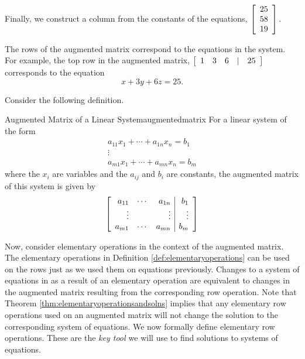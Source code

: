 Finally, we construct a column from the constants of the equations,
$\left[
\begin{array}{r}
25\\
58\\
19
\end{array}
\right] .$ 

The rows of the augmented matrix correspond to the equations in the system. For example, the top
row in the augmented matrix, 
$\left[
\begin{array}{rrrrr}
1 & 3 & 6 & | & 25
\end{array}
\right]$
 corresponds to the equation
\begin{equation*}
x+3y+6z=25.
\end{equation*}

Consider the following definition. 

\begin{definition}{Augmented Matrix of a Linear System}{augmentedmatrix}
For a linear system of the form
\begin{equation*}
\begin{array}{c}
a_{11}x_{1}+\cdots +a_{1n}x_{n}=b_{1} \\
\vdots \\
a_{m1}x_{1}+\cdots +a_{mn}x_{n}=b_{m}
\end{array}
\end{equation*}
where the $x_{i}$ are variables and the $a_{ij}$ and $b_{i}$ are constants, 
the augmented matrix  of this system is given by 
\begin{equation*}
\left[
\begin{array}{rrr|r}
a_{11} & \cdots & a_{1n} &  b_{1} \\
\vdots &  & \vdots &  \vdots \\
a_{m1} & \cdots & a_{mn} &  b_{m}
\end{array}
\right] 
\end{equation*}
\end{definition}

Now, consider elementary operations in the context of the augmented matrix. The elementary operations in Definition \ref{def:elementaryoperations}
can be used on the rows just as we used them on equations previously. Changes to a system of equations in as a result of an
elementary operation are equivalent to changes in the augmented matrix resulting from the corresponding row operation. Note that Theorem \ref{thm:elementaryoperationsandsolns} implies that
any elementary row operations used on an augmented matrix will not change the solution to the corresponding system of equations.
We now formally define elementary row operations. These are the {\em key tool \em}we will use to find solutions to systems of equations. 

